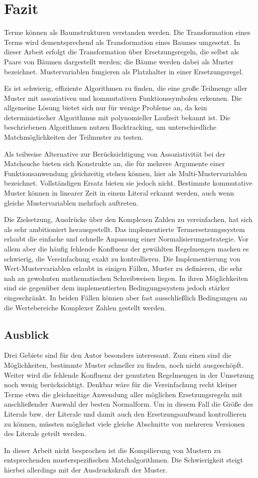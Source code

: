 

\chapter{Fazit} \label{secZusammenfassung}
Terme können als Baumstrukturen verstanden werden. Die Transformation eines Terms wird dementsprechend als Transformation eines Baumes umgesetzt. In dieser Arbeit erfolgt die Transformation über Ersetzungsregeln, die selbst als Paare von Bäumen dargestellt werden; die Bäume werden dabei als Muster bezeichnet. Mustervariablen fungieren als Platzhalter in einer Ersetzungsregel.

Es ist schwierig, effiziente Algorithmen zu finden, die eine große Teilmenge aller Muster mit assoziativen und kommutativen Funktionssymbolen erkennen. Die allgemeine Lösung bietet sich nur für wenige Probleme an, da kein deterministischer Algorithmus mit polynomieller Laufzeit bekannt ist. 
Die beschriebenen Algorithmen nutzen Backtracking, um unterschiedliche Matchmöglichkeiten der Teilmuster zu testen. 

Als teilweise Alternative zur Berücksichtigung von Assoziativität bei der Matchsuche bieten sich Konstrukte an, die für mehrere Argumente einer Funktionsanwendung gleichzeitig stehen können, hier als Multi-Mustervariablen bezeichnet. Vollständigen Ersatz bieten sie jedoch nicht.
Bestimmte kommutative Muster können in linearer Zeit in einem Literal erkannt werden, auch wenn gleiche Mustervariablen mehrfach auftreten. 

Die Zielsetzung, Ausdrücke über den Komplexen Zahlen zu vereinfachen, hat sich als sehr ambitioniert herausgestellt. Das implementierte Termersetzungssystem erlaubt die einfache und schnelle Anpassung einer Normalisierungsstrategie. Vor allem aber die häufig fehlende Konfluenz der gewählten Regelmengen machen es schwierig, die Vereinfachung exakt zu kontrollieren. 
Die Implementierung von Wert-Mustervariablen erlaubt in einigen Fällen, Muster zu definieren, die sehr nah an gewohnten mathematischen Schreibweisen liegen. In ihren Möglichkeiten sind sie gegenüber dem implementierten Bedingungssystem jedoch stärker eingeschränkt. In beiden Fällen können aber fast ausschließlich Bedingungen an die Wertebereiche Komplexer Zahlen gestellt werden.

\section{Ausblick}
Drei Gebiete sind für den Autor besonders interessant. Zum einen sind die Möglichkeiten, bestimmte Muster schneller zu finden, noch nicht ausgeschöpft. Weiter wird die fehlende Konfluenz der genutzten Regelmengen in der Umsetzung noch wenig berücksichtigt. Denkbar wäre für die Vereinfachung recht kleiner Terme etwa die gleichzeitige Anwendung aller möglichen Ersetzungsregeln mit anschließender Auswahl der besten Normalform. Um in diesem Fall die Größe des Literals bzw. der Literale und damit auch den Ersetzungsaufwand kontrollieren zu können, müssten möglichst viele gleiche Abschnitte von mehreren Versionen des Literals geteilt werden. 

In dieser Arbeit nicht besprochen ist die Kompilierung von Mustern zu entsprechenden musterspezifischen Matchalgorithmen. Die Schwierigkeit steigt hierbei allerdings mit der Ausdruckskraft der Muster.






